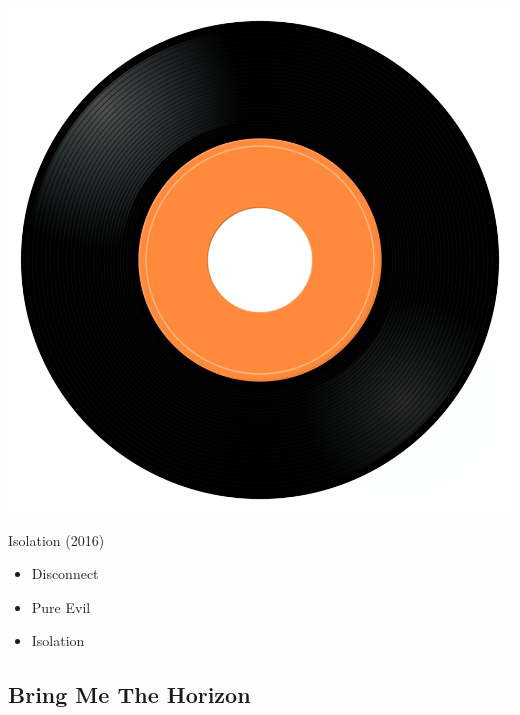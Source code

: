 \begin{minipage}[t]{0.25\textwidth}
\captionsetup{type=figure}
\includegraphics[width=\textwidth]{Images/cover.png}
\caption*{Isolation (2016)}
\end{minipage}
\begin{minipage}[t]{0.25\textwidth}\vspace{0pt}
\begin{itemize}[nosep,leftmargin=1em,labelwidth=*,align=left]
	\setlength{\itemsep}{0pt}
	\item Disconnect
	\item Pure Evil
	\item Isolation
\end{itemize}
\end{minipage}

\subsection{Bring Me The Horizon}

